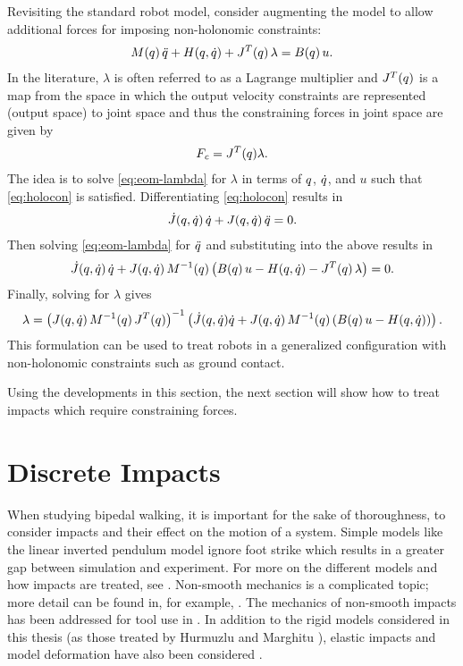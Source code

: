 Revisiting the standard robot model, consider augmenting the model to allow
additional forces for imposing non-holonomic constraints:
%
\begin{align}
  \label{eq:eom-lambda}
  M(q) \, \ddot{q} + H(q, \dot{q}) + J^{T}(q) \, \lambda = B(q) \, u.
\end{align}
%
In the literature, $\lambda$ is often referred to as a Lagrange multiplier
\cite[\S 4.10]{Baruh1998} and $J^{T}(q)$ is a map from the space in which the
output velocity constraints are represented (output space) to joint space and
thus the constraining forces in joint space are given by
%
\begin{align*}
  F_{\mathit{c}} = J^{T}(q) \lambda.
\end{align*}
The idea is to solve \eqref{eq:eom-lambda} for $\lambda$ in terms of $q$,
$\dot{q}$, and $u$ such that \eqref{eq:holocon} is satisfied.
%
Differentiating \eqref{eq:holocon} results in
\begin{align*}
 {\dot J}(q, \dot{q}) \, \dot{q} + J(q, \dot{q}) \, \ddot{q} = 0.
\end{align*}
%
Then solving \eqref{eq:eom-lambda} for $\ddot{q}$ and substituting into the above
results in
\begin{align*}
  {\dot J}(q, \dot{q}) \, \dot{q} + J(q, \dot{q}) \, M^{-1}(q) \left(B(q) \, u
    -H(q, \dot{q}) - J^{T}(q) \, \lambda \right) = 0.
\end{align*}
Finally, solving for $\lambda$ gives
\begin{align*}
   \lambda = \left( J(q, \dot{q}) \, M^{-1}(q) \, J^{T}(q) \right)^{-1}
   \left( {\dot J}(q, \dot{q}) \dot{q} + J(q, \dot{q}) \, M^{-1}(q) \left(B(q) \, u
    -H(q, \dot{q})\right) \right).
\end{align*}
%
This formulation can be used to treat robots in a generalized configuration
with non-holonomic constraints such as ground contact.

Using the developments in this section, the next section will show how to treat
impacts which require constraining forces.

\section{Discrete Impacts}

When studying bipedal walking, it is important for the sake of thoroughness, to
consider impacts and their effect on the motion of a system.
%
Simple models like the linear inverted pendulum model ignore foot strike which
results in a greater gap between simulation and experiment.
%
For more on the different models and how impacts are treated, see
.
%
Non-smooth mechanics is a complicated topic; more detail can be found in, for
example, \cite{Brogliato1996, Kozlov1991}.
%
The mechanics of non-smooth impacts has been addressed for tool use in
\cite{Gorinevsky1997, Siciliano1999}.
%
In addition to the rigid models considered in this thesis (as those treated by
Hurmuzlu and Marghitu \cite{Hurmuzlu1994}), elastic impacts and model
deformation have also been considered \cite{Chapnik1991, Wei1993}.

